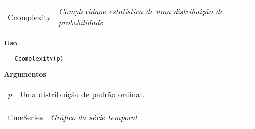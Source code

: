 \documentclass[12pt,letterpaper]{article}
\begin{document}
\hrulefill   

\begin{table}[!h]
\begin{center}
\begin{tabularx}{\textwidth}{ X X}
\hspace{0.5cm} Ccomplexity & \textit{Complexidade estatística de uma distribuição de probabilidade}\\
\end{tabularx}
\end{center}
\end{table} 

\vspace{-0.5cm}

\hrulefill  

\vspace{0.5cm}

\textbf{Uso}

\begin{lstlisting}
   Ccomplexity(p)
\end{lstlisting}

\vspace{0.5cm}

\textbf{Argumentos}

\begin{table}[!h]
\begin{center}
\begin{tabularx}{\textwidth}{X X}
\hspace{0.5cm} \textit{p} & Uma distribuição de padrão ordinal.\\
\end{tabularx}
\end{center}
\end{table} 

\newpage

\hrulefill   

\begin{table}[!h]
\begin{center}
\begin{tabularx}{\textwidth}{ X X}
\hspace{0.5cm} timeSeries & \textit{Gráfico da série temporal}\\
\end{tabularx}
\end{center}
\end{table} 

\vspace{-0.5cm}
\end{document}
